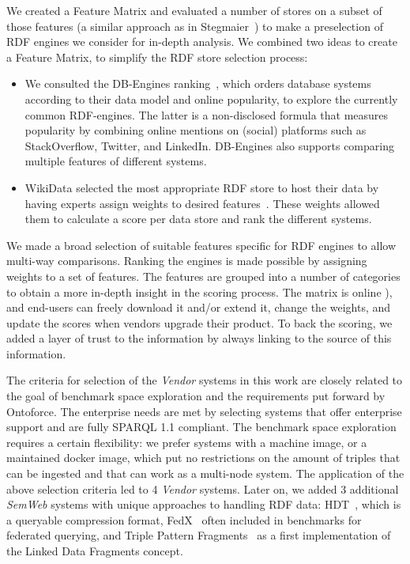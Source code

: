
We created a Feature Matrix and evaluated a number of stores on a subset of those features (a similar approach as in Stegmaier~\cite{Stegmaier_evaluationof}) to make a preselection of RDF engines we consider for in-depth analysis.
We combined two ideas to create a Feature Matrix, to simplify the RDF store selection process:
\begin{itemize}
\item We consulted the DB-Engines ranking~\cite{dbengines}, which orders database systems according to their data model and online popularity, to explore the currently common 
RDF-engines.
The latter is a non-disclosed formula that measures popularity by combining online mentions on (social) platforms such as StackOverflow, Twitter, and LinkedIn. 
DB-Engines also supports comparing multiple features of different systems.
\item WikiData selected the most appropriate RDF store to host their data by having experts assign weights to desired features~\cite{wikidataranking}.
These weights allowed them to calculate a score per data store and rank the different systems. 
\end{itemize}
We made a broad selection of suitable features specific for RDF engines to allow multi-way comparisons. Ranking the engines is made possible by assigning weights to a set of features. 
The features are grouped into a number of categories to obtain a more in-depth insight in the scoring process. 
The matrix is online ), and end-users can freely download it and/or extend it, change the weights, and update the scores when vendors upgrade their product. 
To back the scoring, we added a layer of trust to the information by always linking to the source of this information.

The criteria for selection of the \emph{Vendor} systems in this work are closely related to the goal of benchmark space exploration and the requirements put forward by Ontoforce. 
The enterprise needs are met by selecting systems that offer enterprise support and are fully SPARQL 1.1 compliant. The benchmark space exploration requires a certain flexibility: we prefer systems with a machine image, or a maintained docker image, which put no restrictions on the amount of triples that can be ingested and that can work as a multi-node system.
The application of the above selection criteria led to 4 \emph{Vendor} systems. 
Later on, we added 3 additional \emph{SemWeb} systems with unique approaches to handling RDF data: HDT~\cite{DBLP:journals/ws/FernandezMGPA13}, which is a queryable compression format, FedX~\cite{DBLP:conf/semweb/SchwarteHHSS11} often included in benchmarks for federated querying, and Triple Pattern Fragments~\cite{DBLP:conf/semweb/VerborghHMHVSCCMW14} as a first implementation of the Linked Data Fragments concept.

